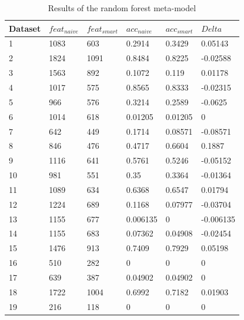 \documentclass[conference]{IEEEtran}
\begin{document}
\begin{table}[!t]
\centering
\caption{Results of the random forest meta-model}
\label{resultstable}
\begin{tabular}{l|lllll}
Dataset & $feat_{naive}$ & $feat_{smart}$ & $acc_{naive}$ & $acc_{smart}$ & $Delta$   \\ \hline
1  & 1083           & 603            & 0.2914        & 0.3429        & 0.05143   \\
2  & 1824           & 1091           & 0.8484        & 0.8225        & -0.02588  \\
3  & 1563           & 892            & 0.1072        & 0.119         & 0.01178   \\
4  & 1017           & 575            & 0.8565        & 0.8333        & -0.02315  \\
5  & 966            & 576            & 0.3214        & 0.2589        & -0.0625   \\
6  & 1014           & 618            & 0.01205       & 0.01205       & 0         \\
7  & 642            & 449            & 0.1714        & 0.08571       & -0.08571  \\
8  & 846            & 476            & 0.4717        & 0.6604        & 0.1887    \\
9  & 1116           & 641            & 0.5761        & 0.5246        & -0.05152  \\
10 & 981            & 551            & 0.35          & 0.3364        & -0.01364  \\
11 & 1089           & 634            & 0.6368        & 0.6547        & 0.01794   \\
12 & 1224           & 689            & 0.1168        & 0.07977       & -0.03704  \\
13 & 1155           & 677            & 0.006135      & 0             & -0.006135 \\
14 & 1155           & 683            & 0.07362       & 0.04908       & -0.02454  \\
15 & 1476           & 913            & 0.7409        & 0.7929        & 0.05198   \\
16 & 510            & 282            & 0             & 0             & 0         \\
17 & 639            & 387            & 0.04902       & 0.04902       & 0         \\
18 & 1722           & 1004           & 0.6992        & 0.7182        & 0.01903   \\
19 & 216            & 118            & 0             & 0             & 0         \\

\end{tabular}
\end{table}
\end{document}
